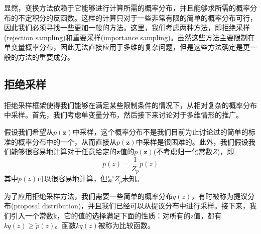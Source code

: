 显然，变换方法依赖于它能够进行计算所需的概率分布，并且能够求所需的概率分布的不定积分的反函数。这样的计算只对于一些非常有限的简单的概率分布可行，因此我们必须寻找一些更加一般的方法。这里，我们考虑两种方法，即拒绝采样(rejection sampling)和重要采样(importance sampling)。虽然这些方法主要限制在单变量概率分布，因此无法直接应用于多维的复杂问题，但是这些方法确定是更一般的方法的重要成分。
\subsection*{拒绝采样}
拒绝采样框架使得我们能够在满足某些限制条件的情况下，从相对复杂的概率分布中采样。首先，我们考虑单变量分布，然后接下来讨论对于多维情形的推广。

假设我们希望从$p(\boldsymbol{z})$中采样，这个概率分布不是我们目前为止讨论过的简单的标准的概率分布中的一个，从而直接从$p(\boldsymbol{z})$中采样是很困难的。此外，我们假设我们能够很容易地计算对于任意给定的$\boldsymbol{z}$值的$p(\boldsymbol{z})$(不考虑归一化常数$Z$)，即
\begin{equation}
	p(z)=\frac{1}{Z_p}\tilde{p}(z)
\end{equation}
其中$\tilde{p}(z)$可以很容易地计算，但是$Z_p$未知。

为了应用拒绝采样方法，我们需要一些简单的概率分布$q(z)$，有时被称为提议分布(proposal distribution)，并且我们已经可以从提议分布中进行采样。接下来，我们引入一个常数k，它的值的选择满足下面的性质：对所有的z值，都有$kq(z)\geqslant \tilde{p}(z)$。函数$kq(z)$被称为比较函数。

